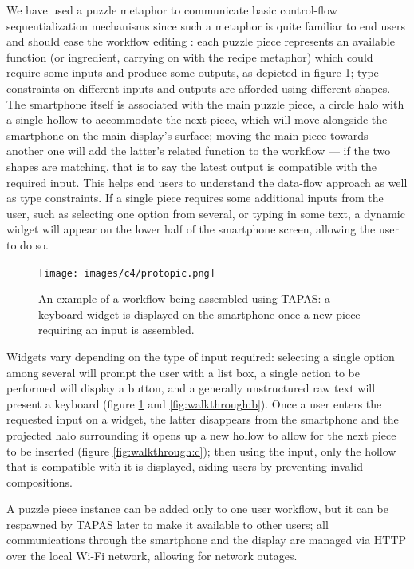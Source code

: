 We have used a puzzle metaphor to communicate basic control-flow sequentialization mechanisms since such a metaphor is quite familiar to end users and should ease the workflow editing \cite{Danado:2012vi}: each puzzle piece represents an available function (or ingredient, carrying on with the recipe metaphor) which could require some inputs and produce some outputs, as depicted in figure \ref{fig:proto}; type constraints on different inputs and outputs are afforded using different shapes. The smartphone itself is associated with the main puzzle piece, a circle halo with a single hollow to accommodate the next piece, which will move alongside the smartphone on the main display's surface; moving the main piece towards another one will add the latter's related function to the workflow --- if the two shapes are matching, that is to say the latest output is compatible with the required input. This helps end users to understand the data-flow approach as well as type constraints. If a single piece requires some additional inputs from the user, such as selecting one option from several, or typing in some text, a dynamic widget will appear on the lower half of the smartphone screen, allowing the user to do so.

\begin{figure}[ht!]
\centering
\texttt{[image: images/c4/protopic.png]}
\caption{An example of a workflow being assembled using \ac{TAPAS}: a keyboard widget is displayed on the smartphone once a new piece requiring an input is assembled.}\label{fig:proto}
\end{figure}

Widgets vary depending on the type of input required: selecting a single option among several will prompt the user with a list box, a single action to be performed will display a button, and a generally unstructured raw text will present a keyboard (figure \ref{fig:proto} and \ref{fig:walkthrough:b}). Once a user enters the requested input on a widget, the latter disappears from the smartphone and the projected halo surrounding it opens up a new hollow to allow for the next piece to be inserted (figure \ref{fig:walkthrough:c}); then using the input, only the hollow that is compatible with it is displayed, aiding users by preventing invalid compositions.

A puzzle piece instance can be added only to one user workflow, but it can be respawned by \ac{TAPAS} later to make it available to other users; all communications through the smartphone and the display are managed via HTTP over the local Wi-Fi network, allowing for network outages.

